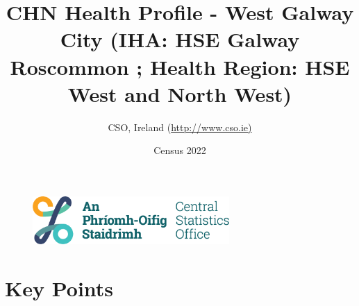 \documentclass{article}
\title{CHN Health Profile - West Galway City (IHA: HSE Galway Roscommon ;  Health Region: HSE West and North West) }
\date{Census 2022}
\author{CSO, Ireland  (\url{http://www.cso.ie)}}
\begin{document}


\begin{figure}
	\centering
\includegraphics[width =75mm]{../figures/CSO_Logo.png}
\end{figure}

				 
		   
						  
														  
																																													
												 
			 
\maketitle
					
													   
				 
						 
																																																																											   
				 
				  
  \pagebreak
    	    \tableofcontents

\pagebreak


\section{Key Points}
\end{document}
